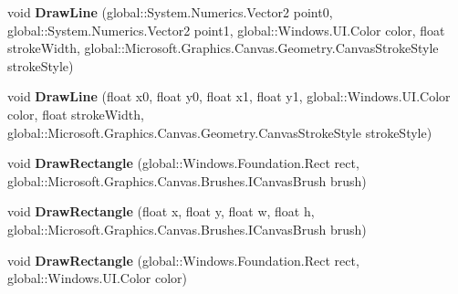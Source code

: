\begin{DoxyCompactItemize}
\item 
\mbox{\label{interface_microsoft_1_1_graphics_1_1_canvas_1_1_i_canvas_drawing_session_aa5127f84e2842c65de826b2860fc4f90}} 
void {\bfseries Draw\+Line} (global\+::\+System.\+Numerics.\+Vector2 point0, global\+::\+System.\+Numerics.\+Vector2 point1, global\+::\+Windows.\+U\+I.\+Color color, float stroke\+Width, global\+::\+Microsoft.\+Graphics.\+Canvas.\+Geometry.\+Canvas\+Stroke\+Style stroke\+Style)
\item 
\mbox{\label{interface_microsoft_1_1_graphics_1_1_canvas_1_1_i_canvas_drawing_session_a6dcbc5a2a7687014bbfb5e21dc5a5041}} 
void {\bfseries Draw\+Line} (float x0, float y0, float x1, float y1, global\+::\+Windows.\+U\+I.\+Color color, float stroke\+Width, global\+::\+Microsoft.\+Graphics.\+Canvas.\+Geometry.\+Canvas\+Stroke\+Style stroke\+Style)
\item 
\mbox{\label{interface_microsoft_1_1_graphics_1_1_canvas_1_1_i_canvas_drawing_session_a419ba76dbcf82a43653f83466e367260}} 
void {\bfseries Draw\+Rectangle} (global\+::\+Windows.\+Foundation.\+Rect rect, global\+::\+Microsoft.\+Graphics.\+Canvas.\+Brushes.\+I\+Canvas\+Brush brush)
\item 
\mbox{\label{interface_microsoft_1_1_graphics_1_1_canvas_1_1_i_canvas_drawing_session_ace14f3c382c98a9f991a0ebc89322afd}} 
void {\bfseries Draw\+Rectangle} (float x, float y, float w, float h, global\+::\+Microsoft.\+Graphics.\+Canvas.\+Brushes.\+I\+Canvas\+Brush brush)
\item 
\mbox{\label{interface_microsoft_1_1_graphics_1_1_canvas_1_1_i_canvas_drawing_session_aed385f9f2e3d138d11ee96a1b41e92cf}} 
void {\bfseries Draw\+Rectangle} (global\+::\+Windows.\+Foundation.\+Rect rect, global\+::\+Windows.\+U\+I.\+Color color)
\item 
\mbox{\label{interface_microsoft_1_1_graphics_1_1_canvas_1_1_i_canvas_drawing_session_a006dca4057187b46ebc6cb7270696a92}} 

\end{DoxyCompactItemize}
